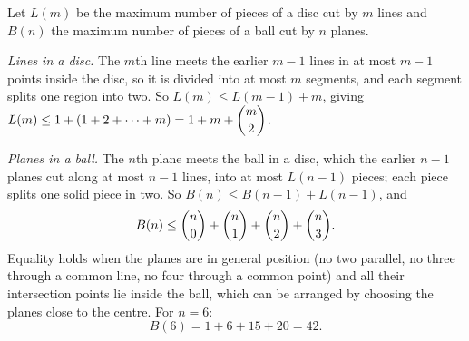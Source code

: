 Let $L(m)$ be the maximum number of pieces of a disc cut by $m$ lines and $B(n)$ the maximum number of pieces of a ball cut by $n$ planes.

\emph{Lines in a disc.} The $m$th line meets the earlier $m-1$ lines in at most $m-1$ points inside the disc, so it is divided into at most $m$ segments, and each segment splits one region into two. So $L(m)\le L(m-1)+m$, giving $L(m)\le1+\left(1+2+\cdots+m\right)=1+m+\dbinom m2$.

\emph{Planes in a ball.} The $n$th plane meets the ball in a disc, which the earlier $n-1$ planes cut along at most $n-1$ lines, into at most $L(n-1)$ pieces; each piece splits one solid piece in two. So $B(n)\le B(n-1)+L(n-1)$, and
\[
B(n)\le\dbinom n0+\dbinom n1+\dbinom n2+\dbinom n3 .
\]
Equality holds when the planes are in general position (no two parallel, no three through a common line, no four through a common point) and all their intersection points lie inside the ball, which can be arranged by choosing the planes close to the centre. For $n=6$:
\[
B(6)=1+6+15+20=\boxed{42}.
\]
